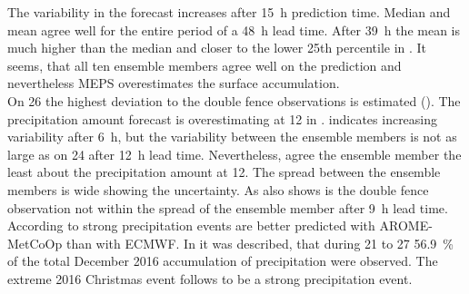 The variability in the forecast increases after \SI{15}{\hour} prediction time. %
Median and mean agree well for the entire period of a \SI{48}{\hour} lead time. After \SI{39}{\hour} the mean is much higher than the median and closer to the lower 25th percentile in . It seems, that all ten ensemble members agree well on the prediction and nevertheless MEPS overestimates the surface accumulation. 
\\
On \SI{26}{\dec} the highest deviation to the double fence observations is estimated (). The precipitation amount forecast is overestimating at \SI{12}{\UTC} in .  indicates increasing variability after \SI{6}{\hour}, but the variability between the ensemble members is not as large as on \SI{24}{\dec} after \SI{12}{\hour} lead time. Nevertheless, agree the ensemble member the least about the precipitation amount at \SI{12}{\UTC}. The spread between the ensemble members is wide showing the uncertainty. As  also shows is the double fence observation not within the spread of the ensemble member after \SI{9}{\hour} lead time. 
According to \citet{muller_arome-metcoop:_2017} strong precipitation events are better predicted with AROME-MetCoOp than with ECMWF. In  it was described, that during \num{21} to \SI{27}{\dec} \SI{56.9}{\percent} of the total December 2016 accumulation of precipitation were observed. The extreme 2016 Christmas event follows to be a strong precipitation event. 
